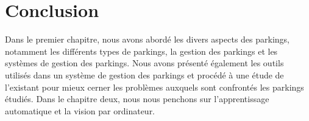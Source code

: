 \section{Conclusion}

Dans le premier chapitre, nous avons abordé les divers aspects des parkings, notamment les différents types de parkings, la gestion des parkings et les systèmes de gestion des parkings. Nous avons présenté également les outils utilisés dans un système de gestion des parkings et procédé à une étude de l'existant pour mieux cerner les problèmes auxquels sont confrontés les parkings étudiés.
Dans le chapitre deux, nous nous penchons sur l'apprentissage automatique et la vision par ordinateur.

